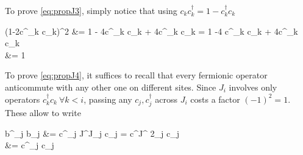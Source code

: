 		To prove \eqref{eq:propJ3}, simply notice that using $c_k c^\dagger_k = 1-c^\dagger_k c_k$
		\be \begin{split} (1-2c^\dagger_k c_k)^2 &= 1 - 4c^\dagger_k c_k + 4c^\dagger_k c_k = 1 -4 c^\dagger_k c_k + 4c^\dagger_k c_k \\ &= 1 \end{split} \ee
		To prove \eqref{eq:propJ4}, it suffices to recall that every fermionic operator anticommute with any other one on different sites. Since $J_i$ involves only operators $c^\dagger_k c_k \ \forall k<i$, passing any $c_j, c^\dagger_j$ across $J_i$ costs a factor $(-1)^2=1$.
		These allow to write
		\be \begin{split} b^\dagger_j b_j &= c^\dagger_j J^\dagger J_j c_j = c^\dagger J^
		2_j c_j \\ &= c^\dagger_j c_j \end{split} \label{eq:bbcc} \ee

